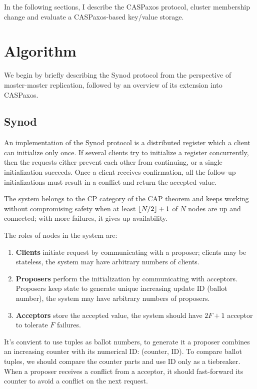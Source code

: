 \documentclass[12pt]{article}
\theoremstyle{definition}
\DeclarePairedDelimiter{\floor}{\lfloor}{\rfloor}
\begin{document}
In the following sections, I describe the CASPaxos protocol, cluster membership change and evaluate a CASPaxos-based key/value storage.

\section{Algorithm}

We begin by briefly describing the Synod protocol from the perspective of master-master replication, followed by an overview of its extension into CASPaxos.

\subsection{Synod}

An implementation of the Synod protocol is a distributed register which a client can initialize only once. If several clients try to initialize a register concurrently, then the requests either prevent each other from continuing, or a single initialization succeeds. Once a client receives confirmation, all the follow-up initializations must result in a conflict and return the accepted value.

The system belongs to the CP category of the CAP theorem and keeps working without compromising safety when at least $\floor{N/2} + 1$ of $N$ nodes are up and connected; with more failures, it gives up availability.

The roles of nodes in the system are:
\begin{enumerate}
  \item {\bf Clients} initiate request by communicating with a proposer; clients may be stateless, the system may have arbitrary numbers of clients.
  \item {\bf Proposers} perform the initialization by communicating with acceptors. Proposers keep state to generate unique increasing update ID (ballot number), the system may have arbitrary numbers of proposers.
  \item {\bf Acceptors} store the accepted value, the system should have $2F+1$ acceptor to tolerate $F$ failures.
\end{enumerate}

It's convient to use tuples as ballot numbers, to generate it a proposer combines an increasing counter with its numerical ID: (counter, ID). To compare ballot tuples, we should compare the counter parts and use ID only as a tiebreaker. When a proposer receives a conflict from a acceptor, it should fast-forward its counter to avoid a conflict on the next request.
\end{document}
